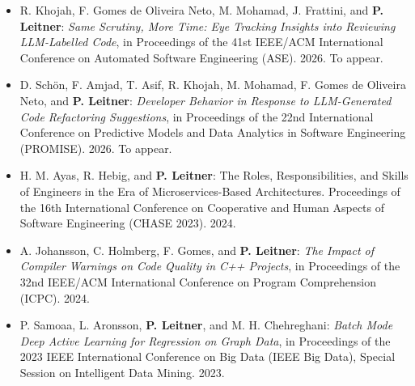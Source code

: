 \documentclass[paper=letter,fontsize=11pt]{scrartcl} %
\begin{document}
\begin{itemize}
  \item R. Khojah, F. Gomes de Oliveira Neto, M. Mohamad, J. Frattini, and \textbf{P. Leitner}: \emph{Same Scrutiny, More Time: Eye Tracking Insights into Reviewing LLM-Labelled Code}, in Proceedings of the 41st IEEE/ACM International Conference on Automated Software Engineering (ASE). 2026. To appear.
  \item D. Sch\"on, F. Amjad, T. Asif, R. Khojah, M. Mohamad, F. Gomes de Oliveira Neto, and \textbf{P. Leitner}: \emph{Developer Behavior in Response to LLM-Generated Code Refactoring Suggestions}, in Proceedings of the 22nd International Conference on Predictive Models and Data Analytics in Software Engineering (PROMISE). 2026. To appear.
  \item  H. M. Ayas, R. Hebig, and \textbf{P. Leitner}: The Roles, Responsibilities, and Skills of Engineers in the Era of
  Microservices-Based Architectures. Proceedings of the 16th International Conference on Cooperative and Human Aspects of Software Engineering (CHASE 2023). 2024. 
  \item  A. Johansson, C. Holmberg, F. Gomes, and \textbf{P. Leitner}: \emph{The Impact of Compiler Warnings on Code Quality in C++ Projects}, in Proceedings of the 32nd IEEE/ACM International Conference on Program Comprehension (ICPC). 2024. 
  \item P. Samoaa, L. Aronsson,  \textbf{P. Leitner}, and M. H. Chehreghani: \emph{Batch Mode Deep Active Learning for Regression on Graph Data}, in Proceedings of the 2023 IEEE International Conference on Big Data (IEEE Big Data), Special Session on Intelligent Data Mining. 2023. 

\end{itemize}
\end{document}
